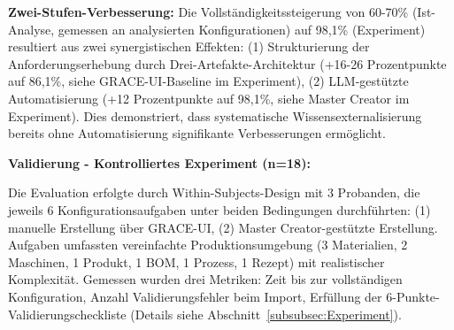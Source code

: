 \noindent \textbf{Zwei-Stufen-Verbesserung:} Die Vollständigkeitssteigerung von 60-70\% (Ist-Analyse, gemessen an analysierten Konfigurationen) auf 98,1\% (Experiment) resultiert aus zwei synergistischen Effekten: (1) Strukturierung der Anforderungserhebung durch Drei-Artefakte-Architektur (+16-26 Prozentpunkte auf 86,1\%, siehe GRACE-UI-Baseline im Experiment), (2) LLM-gestützte Automatisierung (+12 Prozentpunkte auf 98,1\%, siehe Master Creator im Experiment). Dies demonstriert, dass systematische Wissensexternalisierung bereits ohne Automatisierung signifikante Verbesserungen ermöglicht.

\noindent \textbf{Validierung - Kontrolliertes Experiment (n=18):}

\noindent Die Evaluation erfolgte durch Within-Subjects-Design mit 3 Probanden, die jeweils 6 Konfigurationsaufgaben unter beiden Bedingungen durchführten: (1) manuelle Erstellung über GRACE-UI, (2) Master Creator-gestützte Erstellung. Aufgaben umfassten vereinfachte Produktionsumgebung (3 Materialien, 2 Maschinen, 1 Produkt, 1 BOM, 1 Prozess, 1 Rezept) mit realistischer Komplexität. Gemessen wurden drei Metriken: Zeit bis zur vollständigen Konfiguration, Anzahl Validierungsfehler beim Import, Erfüllung der 6-Punkte-Validierungscheckliste (Details siehe Abschnitt~\ref{subsubsec:Experiment}).

\begin{table}[htbp]
\centering
\small
{}
\caption{Experimentdaten Proband 1 (n=6)}
\label{tab:Proband1}
\end{table}


